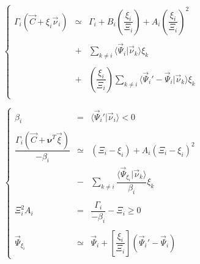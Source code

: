 \documentclass[aps,12pt]{revtex4}
\begin{document}
\begin{equation}
\left\lbrace
\begin{array}{rcl}
	\Gamma_i(\vec{C} + \xi_i \vec{\nu}_i) & \simeq &
	\Gamma_i + B_i \left(\dfrac{\xi_i}{\Xi_i}\right) + A_i \left(\dfrac{\xi_i}{\Xi_i}\right)^2 \\
	\\
	& + & \displaystyle \sum_{k\not=i} \langle \vec{\Psi}_i \vert \vec{\nu}_k \rangle \xi_k \\
	\\
	& + & \displaystyle \left(\dfrac{\xi_i}{\Xi_i}\right) \sum_{k\not=i} \langle \vec{\Psi}_i'-\vec{\Psi}_i \vert \vec{\nu}_k \rangle \xi_k\\
\end{array}
\right.
\end{equation}


\begin{equation}
\left\lbrace
\begin{array}{rcl}
	\beta_i        & = & \langle \vec{\Psi}_i' \vert \vec{\nu}_i \rangle < 0\\
	\\
	\displaystyle \dfrac{\Gamma_i(\vec{C} + \bm{\nu}^T\vec{\xi})}{-\beta_i} & \simeq & \left( \Xi_i -\xi_i\right) + A_i \left(  \Xi_i -\xi_i\right)^2\\
	& - & \displaystyle \sum_{k\not=i} \dfrac{\langle \vec{\Psi}_{\xi_i} \vert \vec{\nu}_k \rangle}{\beta_i} \xi_k\\
	\\
	\Xi_i^2 A_i & = & \dfrac{\Gamma_i}{-\beta_i} - \Xi_i \geq 0\\
	\\
	\vec{\Psi}_{\xi_i} & \simeq &   %
	\vec{\Psi}_i + \left[\dfrac{\xi_i}{\Xi_i}\right]  \left(  \vec{\Psi}_i' - \vec{\Psi}_i\right)
\end{array}
\right.
\end{equation}
\end{document}
